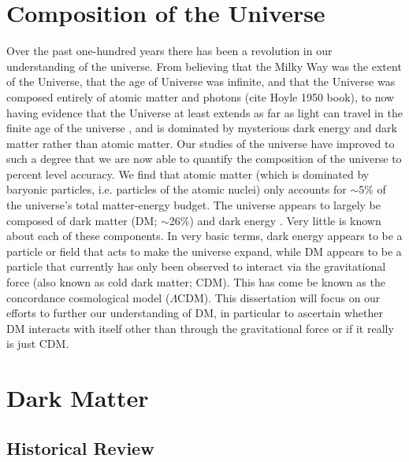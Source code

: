 \label{chapter:1}

\section{Composition of the Universe}\label{section:CompositionOfTheUniverse}

Over the past one-hundred years there has been a revolution in our understanding of the universe.
From believing that the Milky Way was the extent of the Universe, that the age of Universe was infinite, and that the Universe was composed entirely of atomic matter and photons (cite Hoyle 1950 book),
to now having evidence that the Universe at least extends as far as light can travel in the finite age of the universe \citep[$13.817\pm0.048$;][]{Collaboration:2013uv}, and is dominated by mysterious dark energy and dark matter rather than atomic matter.
Our studies of the universe have improved to such a degree that we are now able to quantify the composition of the universe to percent level accuracy. 
We find that atomic matter (which is dominated by baryonic particles, i.e. particles of the atomic nuclei) only accounts for $\sim$5\% of the universe's total matter-energy budget.
The universe appears to largely be composed of dark matter (DM; $\sim$26\%) and dark energy \citep[$\sim$69\%; see][for more accurate values]{Collaboration:2013uv}.
Very little is known about each of these components.
In very basic terms, dark energy appears to be a particle or field that acts to make the universe expand, while DM appears to be a particle that currently has only been observed to interact via the gravitational force (also known as cold dark matter; CDM).
This has come be known as the concordance cosmological model ($\Lambda$CDM).
This dissertation will focus on our efforts to further our understanding of DM, in particular to ascertain whether DM interacts with itself other than through the gravitational force or if it really is just CDM.

\section{Dark Matter}

\subsection{Historical Review}

